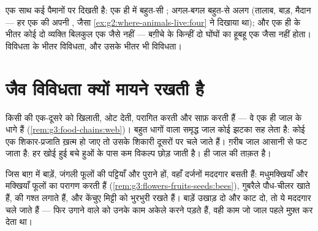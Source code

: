 \begin{remark}[हर पैमाने पर विविधता]\label{rem:g5:biodiversity:scales}
 एक साथ कई पैमानों पर दिखती है: एक ही  में बहुत-सी
; अगल-बगल बहुत-से अलग  (तालाब, बाड़, मैदान --- हर एक की
अपनी , जैसा \cref{ex:g2:where-animals-live:four} ने दिखाया
था); और एक ही  के भीतर कोई दो व्यक्ति बिलकुल एक जैसे नहीं ---
बग़ीचे के किन्हीं दो घोंघों का  हूबहू एक जैसा नहीं होता। विविधता के
भीतर विविधता, और उसके भीतर भी विविधता।
\end{remark}

\section{जैव विविधता क्यों मायने रखती है}

\begin{proposition}[जाल को उसके धागे चाहिए]\label{prop:g5:biodiversity:web}
किसी  की  एक-दूसरे को खिलाती, ओट देती, परागित करती और
साफ़ करती हैं --- वे एक ही जाल के धागे हैं
(\cref{rem:g3:food-chains:web})। बहुत धागों वाला समृद्ध जाल कोई झटका
सह लेता है: कोई एक शिकार-प्रजाति ख़त्म हो जाए तो उसके शिकारी दूसरों पर
चले जाते हैं। ग़रीब जाल आसानी से फट जाता है: हर खोई हुई  बचे
हुओं के पास कम विकल्प छोड़ जाती है।  ही जाल की ताक़त है।
\end{proposition}
\admitted

\begin{example}[बाग़ की कसौटी]\label{ex:g5:biodiversity:orchard}
जिस बाग़ में बाड़ें, जंगली फूलों की पट्टियाँ और पुराने  हों, वहाँ
दर्जनों मददगार  बसती हैं: मधुमक्खियाँ और मक्खियाँ फूलों का
परागण करती हैं (\cref{rem:g3:flowers-fruits-seeds:bees}), गुबरैले
पौध-चीलर खाते हैं,   की गश्त लगाते हैं, और केंचुए मिट्टी
को भुरभुरी रखते हैं। बाड़ें उखाड़ दो और  काट दो, तो ये मददगार चले
जाते हैं --- फिर  उगाने वाले को उनके काम अकेले करने पड़ते हैं, वही
काम जो जाल पहले मुफ़्त कर देता था।
\end{example}

